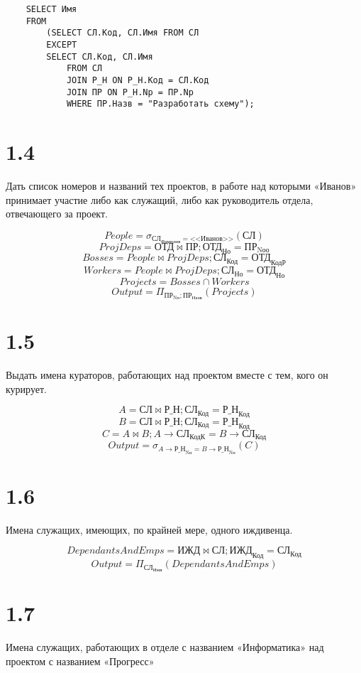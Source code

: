 \documentclass{article}
\newcommand{\employee}{\textbf{СЛ}}
\newcommand{\department}{\textbf{ОТД}}
\newcommand{\project}{\textbf{ПР}}
\newcommand{\dependant}{\textbf{ИЖД}}
\newcommand{\workson}{\textbf{Р\_Н}}
\newcommand{\employeeName}{\textbf{СЛ}_\text{Имя}}
\newcommand{\employeeLastname}{\textbf{СЛ}_\text{Фамилия}}
\newcommand{\employeeId}{\textbf{СЛ}_\text{Код}}
\newcommand{\employeeDepId}{\textbf{СЛ}_\text{Но}}
\newcommand{\employeeCuratorId}{\textbf{СЛ}_\text{КодК}}
\newcommand{\departmentId}{\textbf{ОТД}_\text{Но}}
\newcommand{\departmentBossId}{\textbf{ОТД}_\text{КодР}}
\newcommand{\projectName}{\textbf{ПР}_\text{Назв}}
\newcommand{\projectId}{\textbf{ПР}_\text{Nп}}
\newcommand{\projectResponsibleDepId}{\textbf{ПР}_\text{Nоо}}
\newcommand{\dependantEmpId}{\textbf{ИЖД}_\text{Код}}
\newcommand{\worksonEmpId}{\textbf{Р\_Н}_\text{Код}}
\newcommand{\worksonProjId}{\textbf{Р\_Н}_\text{Nп}}
\newcommand{\filter}[2]{\sigma{}_{#1} \left( #2 \right)}
\newcommand{\join}[3]{ #1 \bowtie #2; #3 }
\newcommand{\select}[2]{\Pi_{#1}\left( #2 \right)}
\begin{document}
\begin{verbatim}
    SELECT Имя
    FROM
        (SELECT СЛ.Код, СЛ.Имя FROM СЛ 
        EXCEPT
        SELECT СЛ.Код, СЛ.Имя
            FROM СЛ
            JOIN Р_Н ON Р_Н.Код = СЛ.Код
            JOIN ПР ON Р_Н.Np = ПР.Np
            WHERE ПР.Назв = "Разработать схему");
\end{verbatim}


\section{1.4}

Дать список номеров {и названий} тех проектов, в работе над которыми «Иванов» принимает участие либо как служащий, либо как руководитель отдела, отвечающего за проект.

$$People = \sigma_{\employeeLastname = \text{<<Иванов>>}}(\employee)$$
$$ProjDeps = \department \bowtie \project; \departmentId = \projectResponsibleDepId$$
$$Bosses = People \bowtie ProjDeps; \employeeId = \departmentBossId$$
$$Workers = People \bowtie ProjDeps; \employeeDepId = \departmentId$$
$$Projects = Bosses \cap Workers$$
$$Output = \select{\projectId; \projectName}{Projects}$$
 
\section{1.5}

Выдать имена кураторов, работающих над проектом вместе с тем, кого он курирует.

$$A = \employee \bowtie \workson; \employeeId = \worksonEmpId$$
$$B = \employee \bowtie \workson; \employeeId = \worksonEmpId$$
$$C = A \bowtie B; A\rightarrow\employeeCuratorId = B\rightarrow\employeeId$$
$$Output = \filter{A\rightarrow\worksonProjId = B\rightarrow\worksonProjId}{C}$$

\section{1.6}

Имена служащих, имеющих, по крайней мере, одного иждивенца.

$$ DependantsAndEmps = \join{\dependant}{\employee}{\dependantEmpId = \employeeId} $$
$$ Output = \select{\employeeName}{DependantsAndEmps} $$

\section{1.7}
Имена служащих, работающих в отделе с названием «Информатика» над проектом с названием «Прогресс»
\end{document}
